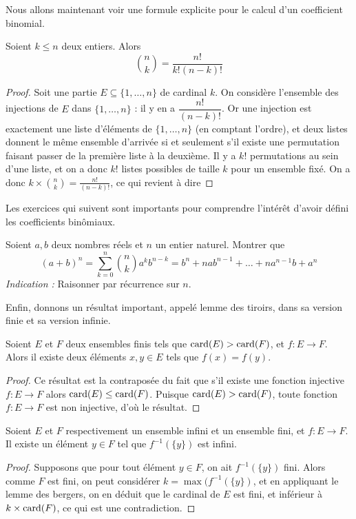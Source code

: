 
Nous allons maintenant voir une formule explicite pour le calcul d'un coefficient binomial.

\begin{prop}
    Soient $k\leq n$ deux entiers. Alors $$\binom{n}{k}=\frac{n!}{k!(n-k)!}$$
\end{prop}
\begin{proof}
    Soit une partie $E\subseteq\{1,\ldots,n\}$ de cardinal $k$. On considère l'ensemble des injections de $E$ dans $\{1,\ldots,n\}$ : il y en a $\dfrac{n!}{(n-k)!}$. Or une injection est exactement une liste d'éléments de $\{1,\ldots,n\}$ (en comptant l'ordre), et deux listes donnent le même ensemble d'arrivée si et seulement s'il existe une permutation faisant passer de la première liste à la deuxième. Il y a $k!$ permutations au sein d'une liste, et on a donc $k!$ listes possibles de taille $k$ pour un ensemble fixé. On a donc $\displaystyle{k\times \binom{n}{k}=\frac{n!}{(n-k)!}}$, ce qui revient à dire 
\end{proof}

Les exercices qui suivent sont importants pour comprendre l'intérêt d'avoir défini les coefficients binômiaux.

\begin{exo}
    Soient $a,b$ deux nombres réels et $n$ un entier naturel. Montrer que $$(a+b)^n=\sum_{k=0}^n\binom{n}{k}a^kb^{n-k}=b^n+nab^{n-1}+\ldots+na^{n-1}b+a^n$$ \textit{Indication :} Raisonner par récurrence sur $n$.
\end{exo}

Enfin, donnons un résultat important, appelé lemme des tiroirs, dans sa version finie et sa version infinie.

\begin{lem}
    Soient $E$ et $F$ deux ensembles finis tels que $\mathrm{card}(E) > \mathrm{card}(F)$, et $f : E \to F$. Alors il existe deux éléments $x,y\in E$ tels que $f(x)=f(y)$.
\end{lem}

\begin{proof}
    Ce résultat est la contraposée du fait que s'il existe une fonction injective $f : E \to F$ alors $\mathrm{card}(E) \leq \mathrm{card}(F)$. Puisque $\mathrm{card}(E) > \mathrm{card}(F)$, toute fonction $f : E \to F$ est non injective, d'où le résultat.
\end{proof}

\begin{lem}
    Soient $E$ et $F$ respectivement un ensemble infini et un ensemble fini, et $f : E \to F$. Il existe un élément $y\in F$ tel que $f^{-1}(\{y\})$ est infini.
\end{lem}

\begin{proof}
    Supposons que pour tout élément $y\in F$, on ait $f^{-1}(\{y\})$ fini. Alors comme $F$ est fini, on peut considérer $k = \max(f^{-1}(\{y\})$, et en appliquant le lemme des bergers, on en déduit que le cardinal de $E$ est fini, et inférieur à $k\times \mathrm{card}(F)$, ce qui est une contradiction.
\end{proof}

\newpage